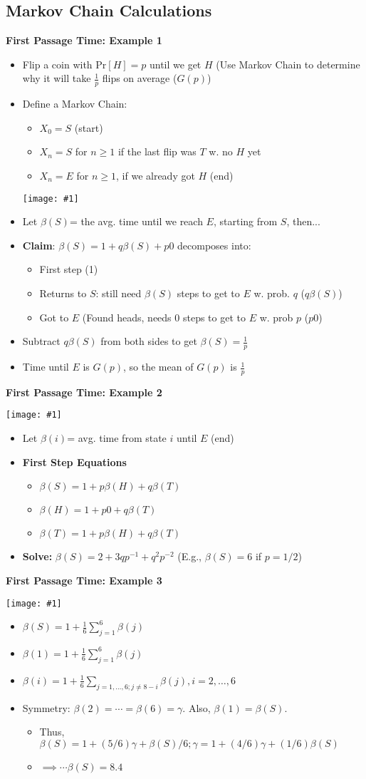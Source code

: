 \documentclass{article}
\newcommand{\pr}[1]{\textrm{Pr}[#1]}
\newcommand{\dpic}[1]{\begin{center}\texttt{[image: \#1]}\end{center}}
\newcommand{\tpic}[1]{\begin{center}\texttt{[image: \#1]}\end{center}}
\newcommand{\sumlim}[3]{\sum\limits_{#1}^{#2}#3}
\newcommand{\items}[1]{\begin{itemize}#1\end{itemize}}
\begin{document}
\subsection*{Markov Chain Calculations}
\textbf{First Passage Time: Example 1}
\items{
    \item Flip a coin with $\pr{H}=p$ until we get $H$ (Use Markov Chain to determine why it will take $\frac{1}{p}$ flips on average ($G(p)$)
    \item Define a Markov Chain:
    \items{
        \item $X_0=S$ (start)
        \item $X_n=S$ for $n\ge1$ if the last flip was $T$ w. no $H$ yet
        \item $X_n=E$ for $n \ge 1$, if we already got $H$ (end)
    }
    \tpic{se}
    \item Let $\beta(S)$= the avg. time until we reach $E$, starting from $S$, then...
    \item \textbf{Claim}: $\beta(S)=1+q\beta(S)+p0$ decomposes into:
    \items{
        \item First step (1)
        \item Returns to $S$: still need $\beta(S)$ steps to get to $E$ w. prob. $q$ ($q\beta(S)$)
        \item Got to $E$ (Found heads, needs 0 steps to get to $E$ w. prob $p$ ($p0$)
    }
    \item Subtract $q\beta(S)$ from both sides to get $\beta(S)=\frac{1}{p}$
    \item Time until $E$ is $G(p)$, so the mean of $G(p)$ is $\frac{1}{p}$
}
\textbf{First Passage Time: Example 2}
\dpic{fpt2}
\items{
    \item Let $\beta(i)$= avg. time from state $i$ until $E$ (end)
    \item \textbf{First Step Equations}
    \items{
        \item $\beta(S)=1+p\beta(H)+q\beta(T)$
        \item $\beta(H)=1+p0+q\beta(T)$
        \item $\beta(T)=1+p\beta(H)+q\beta(T)$
    }
    \item \textbf{Solve:} $\beta(S) = 2+3qp^{-1} +q^2p^{-2}$ (E.g., $\beta(S) = 6$ if $p = 1/2$)
}
\textbf{First Passage Time: Example 3}
\dpic{fpt3}
\items{
    \item $\beta(S) = 1+\frac{1}{6}\sumlim{j=1}{6}{\beta(j)}$
    \item $\beta(1) = 1+\frac{1}{6}\sumlim{j=1}{6}{\beta(j)}$
    \item $\beta(i) = 1+\frac{1}{6}\sumlim{j=1,\ldots,6;j\ne8−i}{}{\beta(j)},i = 2,\ldots,6$
    \item Symmetry: $\beta(2) = \cdots = \beta(6) = \gamma$. Also, $\beta(1) = \beta(S)$.
    \items {
    	\item Thus, $\beta(S) = 1+ (5/6)\gamma +\beta(S)/6; \gamma = 1+ (4/6)\gamma + (1/6)\beta(S)$
    	\item $\implies \cdots \beta(S) = 8.4$
    }
}
\end{document}
